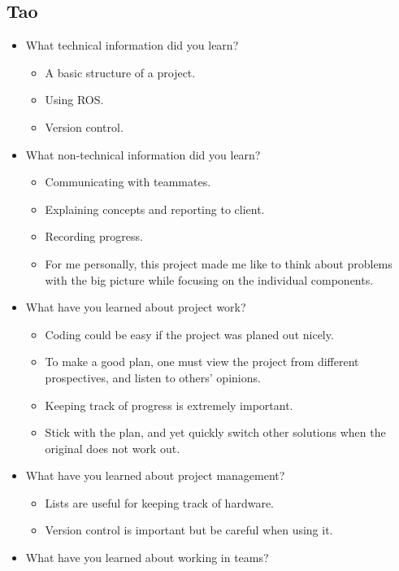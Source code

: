 \documentclass[compsoc,draftclsnofoot,onecolumn,10pt]{IEEEtran}
\begin{document}
\subsection{Tao}
\begin{itemize}
    \item What technical information did you learn?
    \begin{itemize}
      \item A basic structure of a project.
      \item Using ROS.
      \item Version control.
    \end{itemize}
    \item What non-technical information did you learn?
    \begin{itemize}
      \item Communicating with teammates.
      \item Explaining concepts and reporting to client.
      \item Recording progress.
      \item For me personally, this project made me like to think about
      problems with the big picture while focusing on the individual components.
    \end{itemize}
    \item What have you learned about project work?
    \begin{itemize}
      \item Coding could be easy if the project was planed out nicely.
      \item To make a good plan, one must view the project from different
      prospectives, and listen to others' opinions.
      \item Keeping track of progress is extremely important.
      \item Stick with the plan, and yet quickly switch other solutions
      when the original does not work out.
    \end{itemize}
    \item What have you learned about project management?
      \begin{itemize}
        \item Lists are useful for keeping track of hardware.
        \item Version control is important but be careful when using it.
      \end{itemize}
    \item What have you learned about working in teams?
    \begin{itemize}

\end{itemize}
\end{itemize}
\end{document}
